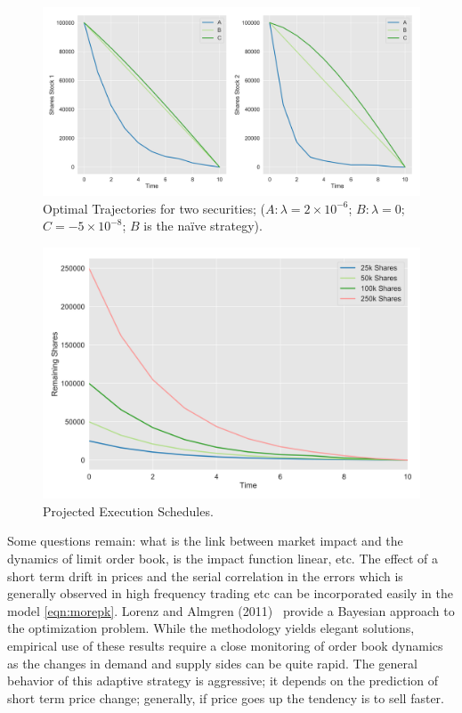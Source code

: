 	\begin{figure}[!ht]
	\centering
	\includegraphics[width=\textwidth]{chapters/chapter_exec_models/figures/opt_traj1.png}
	\caption{Optimal Trajectories for two securities; ($A: \lambda= 2 \times 10^{-6}$; $B: \lambda=0$; $C= -5 \times 10^{-8}$; $B$ is the na\"ive strategy).\label{fig:7first}}
	\end{figure}
	\begin{figure}[!ht] 
	\centering
	\includegraphics[width=\textwidth]{chapters/chapter_exec_models/figures/opt_traj2.png}
	\caption{Projected Execution Schedules.\label{fig:7second}}
	\end{figure}
 

Some questions remain: what is the link between market impact and the dynamics of limit order book, is the impact function linear, etc. The effect of a short term drift in prices and the serial correlation in the errors which is generally observed in high frequency trading etc can be incorporated easily in the model \eqref{eqn:morepk}. Lorenz and Almgren (2011)~\cite{lovenz2011} provide a Bayesian approach to the optimization problem. While the methodology yields elegant solutions, empirical use of these results require a close monitoring of order book dynamics as the changes in demand and supply sides can be quite rapid. The general behavior of this adaptive strategy is aggressive; it depends on the prediction of short term price change; generally, if price goes up the tendency is to sell faster. 


